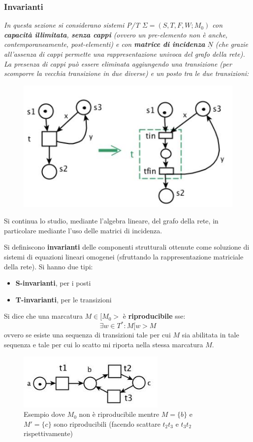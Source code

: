 \documentclass[a4paper,12pt, oneside]{book}
\begin{document}
\subsubsection{Invarianti}
\emph{In questa sezione si considerano sistemi P/T $\Sigma=(S,T,F,W;M_0)$ con
  \textbf{capacità illimitata}, \textbf{senza cappi} (ovvero un pre-elemento non
  è anche, contemporaneamente, post-elementi) e con \textbf{matrice di
    incidenza} $\underline{N}$ (che grazie all'assenza di cappi permette una
  rappresentazione univoca del grafo della rete). La presenza di cappi può
  essere eliminata aggiungendo una transizione (per scomporre la vecchia
  transizione in due diverse) e un posto tra le due transizioni:}
\begin{figure}[H]
  \centering
  \includegraphics[scale = 0.5]{img/cap.jpg}
\end{figure}
Si continua lo studio, mediante l'algebra lineare, del grafo della rete, in
particolare mediante l'uso delle matrici di incidenza.
\newpage
\begin{definizione}
  Si definiscono \textbf{invarianti} delle componenti strutturali ottenute come
  soluzione di sistemi di equazioni lineari omogenei (sfruttando la
  rappresentazione matriciale della rete). Si hanno due tipi:
  \begin{itemize}
    \item \textbf{S-invarianti}, per i posti
    \item \textbf{T-invarianti}, per le transizioni
  \end{itemize}
\end{definizione}
\begin{definizione}
  Si dice che una marcatura $M\in[M_0>$ è \textbf{riproducibile} sse:
  \[\exists w\in T^*:M[w>M\]
  ovvero se esiste una sequenza di transizioni tale per cui $M$ sia abilitata in
  tale sequenza e tale per cui lo scatto mi riporta nella stessa marcatura $M$.
  \begin{figure}[H]
    \centering
    \includegraphics[scale = 0.5]{img/ti.jpg}
    \caption{Esempio dove $M_0$ non è riproducibile mentre $M=\{b\}$ e\\
      $M'=\{c\}$ sono riproducibili (facendo scattare $t_2t_3$ e $t_3t_2$
      rispettivamente)} 
  \end{figure}
\end{definizione}
\end{document}
